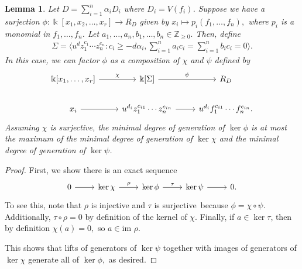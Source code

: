 \documentclass{amsart}
\theoremstyle{plain}
\newtheorem{lem}[thm]{Lemma}
\theoremstyle{definition}
\theoremstyle{remark}
\numberwithin{equation}{section}
\newcommand\bz{{\mathbb Z}}
\newcommand\bk{{\Bbbk}}
\newcommand\im{\text{im }}
\newcommand\bida{a}
\newcommand\bidb{b}
\begin{document}
\begin{lem}
\label{lem:composite-map}
Let $D = \sum_{i=1}^{n}\alpha_i D_i$ where $D_i = V(f_i)$. Suppose we have a surjection $\phi: \bk[x_1,x_2,\ldots, x_r] \rightarrow R_D$ given by $x_i \mapsto p_i(f_1, \ldots, f_n),$ where $p_i$ is a monomial in $f_1,\ldots, f_n$. Let $\bida_1, \ldots, \bida_n, \bidb_1, \ldots, \bidb_n \in \bz_{\geq 0}.$ Then, define
\begin{align*}
	\Sigma = \langle u^d z_1^{c_1} \cdots z_n^{c_n} : c_i \geq -d \alpha_i, \sum_{i=1}^{n} \bida_i c_i = \sum_{i=1}^{n} \bidb_i c_i = 0 \rangle. 
\end{align*}
In this case, we can factor $\phi$ as a composition of $\chi$ and $\psi$ defined by
\[
\begin{tikzcd}
\bk[x_1,\ldots, x_r] \ar {r}{\chi} & \bk[\Sigma] \ar {r}{\psi} & R_D \\
x_i \ar r & u^{d_i}z_1^{c_{i1}} \cdots z_n^{c_{in}} \ar r & u^{d_i}f_1^{c_{i1}} \cdots f_n^{c_{in}}.
\end{tikzcd}
\]
Assuming $\chi$ is surjective, the minimal degree of generation of $\ker \phi$ is at most the maximum of the minimal degree of generation of $\ker \chi$ and the minimal degree of generation of $\ker \psi$.
\end{lem}
\begin{proof}
First, we show there is an exact sequence
\[
\begin{tikzcd}
0 \ar {r} & \ker \chi \ar{r}{\rho} & \ker \phi \ar {r}{\tau} & \ker \psi \ar r & 0.
\end{tikzcd}
\]
To see this, note that $\rho$ is injective and $\tau$ is surjective\ because $\phi = \chi \circ \psi$. Additionally, $\tau \circ \rho = 0$ by definition of the kernel of $\chi$. Finally, if $a \in\ker \tau$, then by definition $\chi(a) = 0,$ so $a \in \im \rho$.

This shows that lifts of generators of $\ker \psi$ together with images of generators of $\ker \chi$ generate all of $\ker \phi,$ as desired. 
\end{proof}
\end{document}
